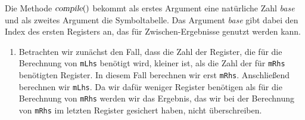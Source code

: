 Die Methode $\textsl{compile}()$ bekommt als erstes Argument eine nat\"urliche Zahl
\textsl{base} und als zweites Argument die Symboltabelle.  Das Argument \textsl{base} gibt
dabei den Index des ersten Registers an, das f\"ur Zwischen-Ergebnisse genutzt werden kann.
\begin{enumerate}
\item Betrachten wir zun\"achst den Fall, dass die Zahl der Register, die f\"ur die Berechnung von
      \texttt{mLhs} ben\"otigt wird, kleiner ist, als die Zahl der f\"ur \texttt{mRhs} ben\"otigten
      Register.  In diesem Fall berechnen wir erst \texttt{mRhs}.  Anschlie{\ss}end berechnen
      wir \texttt{mLhs}.  Da wir daf\"ur weniger Register ben\"otigen als f\"ur die Berechnung
      von \texttt{mRhs} werden wir das Ergebnis, das wir bei der Berechnung von
      \texttt{mRhs} im letzten Register gesichert haben, nicht \"uberschreiben.


\end{enumerate}
